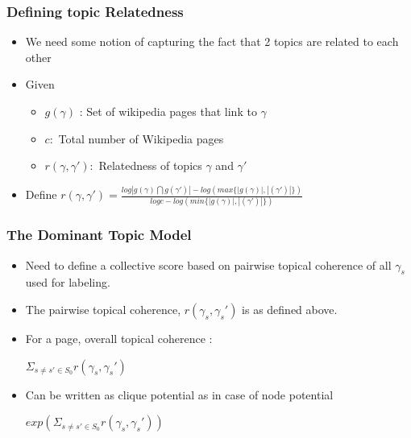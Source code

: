 \begin{frame}
  \frametitle{Defining topic Relatedness}
  \begin{itemize}
   \item We need some notion of capturing the fact that 2 topics are related to each other \medskip
   \item Given
   \begin{itemize}
    \item $g(\gamma)$ : Set of wikipedia pages that link to $\gamma$
    \item $c :$ Total number of Wikipedia pages
    \item $r(\gamma, \gamma') :$ Relatedness of topics $\gamma$ and $\gamma'$
   \end{itemize}\bigskip

    
   \item Define $ r(\gamma, \gamma') = \frac{log|g(\gamma) \bigcap g(\gamma')| - log(max\{|g(\gamma)|, |(\gamma')|\})} {log c - log(min\{|g(\gamma)|, |(\gamma')|\})}$ 

  \end{itemize}

  
 \end{frame}

 
\begin{frame}
  \frametitle{The Dominant Topic Model}
  \begin{itemize}
   \item Need to define a collective score based on pairwise topical coherence of all $\gamma_s$ used for labeling. \medskip
   \item The pairwise topical coherence, $r(\gamma_s, \gamma_s')$ is as defined above.\medskip
   \item For a page, overall topical coherence : \begin{center}\medskip
                                                  $\Sigma_{s \neq s' \in S_0}r(\gamma_s, \gamma_s')$
                                                 \end{center}
   \item Can be written as clique potential as in case of node potential\medskip
      \begin{center}
	$exp(\Sigma_{s \neq s' \in S_0}r(\gamma_s, \gamma_s'))$
      \end{center}

  \end{itemize}

 \end{frame}

